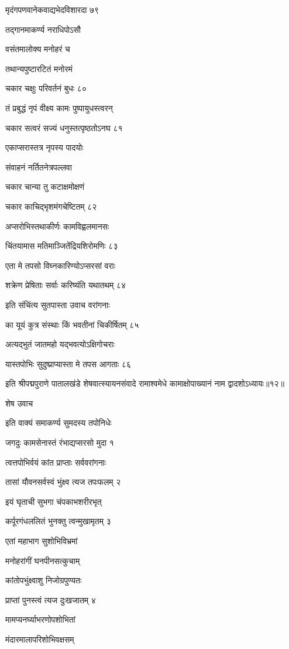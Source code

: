 मृदंगपणवानेकवाद्यभेदविशारदा ७९

तद्गानमाकर्ण्य नराधिपोऽसौ

वसंतमालोक्य मनोहरं च

तथान्यपुष्टारटितं मनोरमं

चकार चक्षुः परिवर्तनं बुधः ८०

तं प्रबुद्धं नृपं वीक्ष्य कामः पुष्पायुधस्त्वरन्

चकार सत्वरं सज्यं धनुस्तत्पृष्ठतोऽनघ ८१

एकाप्सरास्तत्र नृपस्य पादयोः

संवाहनं नर्तितनेत्रपल्लवा

चकार चान्या तु कटाक्षमोक्षणं

चकार काचिद्भृशमंगचेष्टितम् ८२

अप्सरोभिस्तथाकीर्णः कामविह्वलमानसः

चिंतयामास मतिमाञ्जितेंद्रियशिरोमणिः ८३

एता मे तपसो विघ्नकारिण्योऽप्सरसां वराः

शक्रेण प्रेषिताः सर्वाः करिष्यंति यथातथम् ८४

इति संचिंत्य सुतपास्ता उवाच वरांगनाः

का यूयं कुत्र संस्थाः किं भवतीनां चिकीर्षितम् ८५

अत्यद्भुतं जातमहो यद्भवत्योऽक्षिगोचराः

यास्तपोभिः सुदुष्प्राप्यास्ता मे तपस आगताः ८६

इति श्रीपद्मपुराणे पातालखंडे शेषवात्स्यायनसंवादे रामाश्वमेधे कामाक्षोपाख्यानं नाम द्वादशोऽध्यायः॥१२॥


शेष उवाच

इति वाक्यं समाकर्ण्य सुमदस्य तपोनिधेः

जगदुः कामसेनास्तं रंभाद्यप्सरसो मुदा १

त्वत्तपोभिर्वयं कांत प्राप्ताः सर्ववरांगनाः

तासां यौवनसर्वस्वं भुंक्ष्व त्यज तपःफलम् २

इयं घृताची सुभगा चंपकाभशरीरभृत्

कर्पूरगंधललितं भुनक्तु त्वन्मुखामृतम् ३

एतां महाभाग सुशोभिविभ्रमां

मनोहरांगीं घनपीनसत्कुचाम्

कांतोपभुंक्ष्वाशु निजोग्रपुण्यतः

प्राप्तां पुनस्त्वं त्यज दुःखजातम् ४

मामप्यनर्घ्याभरणोपशोभितां

मंदारमालापरिशोभिवक्षसम्

